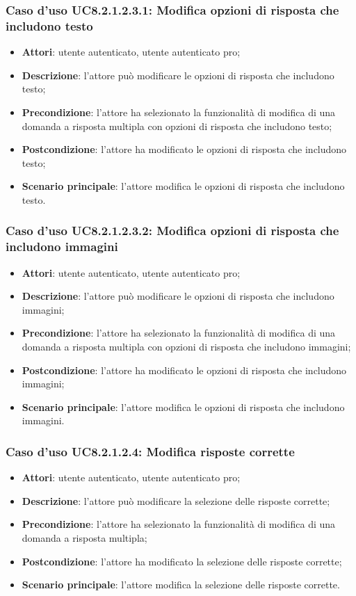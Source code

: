 \subsubsection{Caso d'uso UC8.2.1.2.3.1: Modifica opzioni di risposta che includono testo}
	\begin{itemize}
		\item
			\textbf{Attori}: utente autenticato, utente autenticato pro;
		\item		
			\textbf{Descrizione}: l'attore può modificare le opzioni di risposta che includono testo;
		\item
			\textbf{Precondizione}: l'attore ha selezionato la funzionalità di modifica di una domanda a risposta multipla con opzioni di risposta che includono testo; 
		\item
			\textbf{Postcondizione}: l'attore ha modificato le opzioni di risposta che includono testo;
		\item
			\textbf{Scenario principale}: l'attore modifica le opzioni di risposta che includono testo. 			
	\end{itemize}	
	
\subsubsection{Caso d'uso UC8.2.1.2.3.2: Modifica opzioni di risposta che includono immagini}
	\begin{itemize}
		\item
			\textbf{Attori}: utente autenticato, utente autenticato pro;
		\item		
			\textbf{Descrizione}: l'attore può modificare le opzioni di risposta che includono immagini;
		\item
			\textbf{Precondizione}: l'attore ha selezionato la funzionalità di modifica di una domanda a risposta multipla con opzioni di risposta che includono immagini; 
		\item
			\textbf{Postcondizione}: l'attore ha modificato le opzioni di risposta che includono immagini;
		\item
			\textbf{Scenario principale}: l'attore modifica le opzioni di risposta che includono immagini. 			
	\end{itemize}
	
\subsubsection{Caso d'uso UC8.2.1.2.4: Modifica risposte corrette}
	\begin{itemize}
		\item
			\textbf{Attori}: utente autenticato, utente autenticato pro;
		\item		
			\textbf{Descrizione}: l'attore può modificare la selezione delle risposte corrette;
		\item
			\textbf{Precondizione}: l'attore ha selezionato la funzionalità di modifica di una domanda a risposta multipla;
		\item
			\textbf{Postcondizione}: l'attore ha modificato la selezione delle risposte corrette;
		\item
			\textbf{Scenario principale}: l'attore modifica la selezione delle risposte corrette. 			
	\end{itemize}
